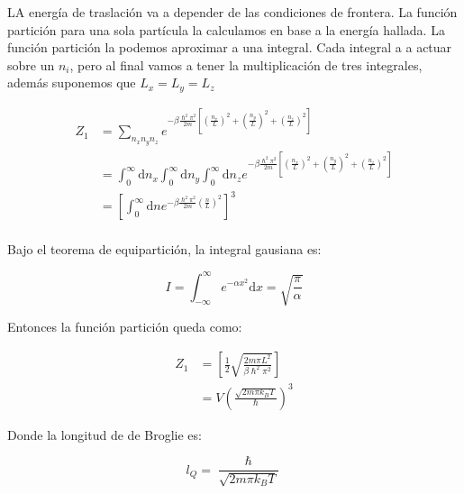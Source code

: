 \documentclass[11pt,fleqn]{book}
\begin{document}
LA energía de traslación va a depender de las condiciones de frontera. La función partición para una sola partícula la calculamos en base a la energía hallada. La función partición la podemos aproximar a una integral. Cada integral a a actuar sobre un $n_{i}$, pero al final vamos a tener la multiplicación de tres integrales, además suponemos que $L_{x}=L_{y}=L_{z}$


\begin{equation}
\begin{split}
    Z_{1}&=\sum_{n_{x}n_{y}n_{z}}e^{-\beta\frac{\hslash^{2}\pi^{2}}{2m}\left[\left(\frac{n_{x}}{L}\right)^{2}+\left(\frac{n_{y}}{L}\right)^{2}+\left(\frac{n_{z}}{L}\right)^{2}\right]}\\
    &=\int_{0}^{\infty}\mathrm{d}n_{x}\int_{0}^{\infty}\mathrm{d}n_{y}\int_{0}^{\infty}\mathrm{d}n_{z}e^{-\beta\frac{\hslash^{2}\pi^{2}}{2m}\left[\left(\frac{n_{x}}{L}\right)^{2}+\left(\frac{n_{y}}{L}\right)^{2}+\left(\frac{n_{z}}{L}\right)^{2}\right]}\\
    &=\left[\int_{0}^{\infty}\mathrm{d}ne^{-\beta\frac{\hslash^{2}\pi^{2}}{2m}\left(\frac{n}{L}\right)^{2}}\right]^{3}\\
\end{split}
    \label{Eq. 4.68}
\end{equation}

\begin{remark}
Bajo el teorema de equipartición, la integral gausiana es:

\begin{equation*}
    I=\int_{-\infty}^{\infty}e^{-\alpha x^{2}}\mathrm{d}x=\sqrt{\frac{\pi}{\alpha}}
\end{equation*}

\end{remark}

Entonces la función partición queda como:

\begin{equation}
\begin{split}
        Z_{1}&=\left[\frac{1}{2}\sqrt{\frac{2m\pi L^{2}}{\beta\hslash^{2}\pi^{2}}}\right]\\
        &=V\left(\frac{\sqrt{2m\pi k_{B}T}}{\hslash}\right)^{3}
        \end{split}
    \label{Eq. 4.69}
\end{equation}

Donde la longitud de de Broglie es:

\begin{equation}
        l_{Q}=\frac{\hslash}{\sqrt{2m\pi k_{B}T}}
   \label{Eq. 4.70}
\end{equation}
\end{document}
